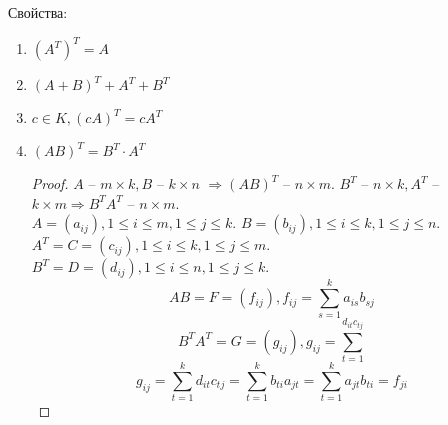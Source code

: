 \documentclass[12pt]{article}
\newenvironment{MyList}[1][4pt]{
  \begin{enumerate}[1.]
  \setlength{\parskip}{0pt}
  \setlength{\itemsep}{#1}
}{       
  \end{enumerate}
}
\def\SO{\Rightarrow}     %
\theoremstyle{definition} %
\theoremstyle{plain} %
\theoremstyle{remark} %
\begin{document}
{Свойства:
\begin{MyList}
    \item $(A^T)^T = A$ 
    \item $(A + B)^T + A^T + B^T$ 
    \item $c \in K, (cA)^T = cA^T$ 
    \item $(AB)^T = B^T \cdot A^T$ 
    \begin{proof}
        $A$ -- $m \times k, B$  -- $k \times n$ $\SO (AB)^T$ -- $n \times m$.
        $B^T$ -- $n \times k, A^T$ -- $k \times m \SO B^T A^T$ -- $n \times m$. \\
        $A = (a_{ij}), 1 \leqslant i \leqslant m, 1 \leqslant j \leqslant k$. $B = (b_{ij}), 1 \leqslant i \leqslant k, 1 \leqslant j \leqslant n$. \\
        $A^T = C = (c_{ij}), 1 \leqslant i \leqslant k, 1 \leqslant j \leqslant m$. \\
        $B^T = D = (d_{ij}), 1 \leqslant i \leqslant n, 1 \leqslant j \leqslant k$.
        \[AB = F = (f_{ij}), f_{ij} = \sum_{s=1}^{k} a_{is} b_{sj}\]
        \[B^TA^T = G = (g_{ij}), g_{ij} = \sum_{t=1}^{d_{it} c_{tj}}\]
        \[g_{ij} = \sum_{t=1}^{k} d_{it} c_{tj} = \sum_{t=1}^{k} b_{ti} a_{jt} = \sum_{t=1}^{k} a_{jt} b_{ti} = f_{ji}\]
    \end{proof}
\end{MyList}
\end{document}
